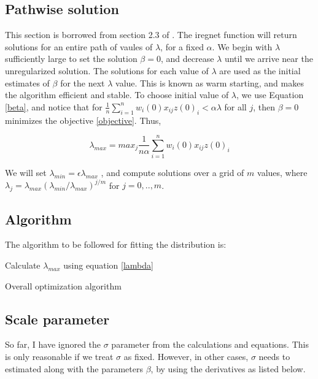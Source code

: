 \documentclass[12pt,a4paper]{report}
\begin{document}
\subsection*{Pathwise solution}
This section is borrowed from section 2.3 of \cite{a3}.
The iregnet function will return solutions for an entire path of vaules of $\lambda$, for a fixed $\alpha$.
We begin with $\lambda$ sufficiently large to set the solution $\beta = 0$, and decrease $\lambda$ until we arrive
near the unregularized solution. The solutions for each value of $\lambda$ are used as the initial
estimates of $\beta$ for the next $\lambda$ value. This is known as warm starting, and makes the algorithm efficient and stable.
To choose initial value of $\lambda$, we use Equation \ref{beta}, and notice that for $\frac{1}{n} \sum_{i=1}^n w_i(0) x_{ij} z(0)_i < \alpha \lambda$ for all $j$, then $\beta = 0$ minimizes the objective \ref{objective}. Thus,

\begin{equation} \label{lambda}
\lambda_{max} = max_j \frac{1}{n \alpha} \sum_{i=1}^n w_i(0) x_{ij} z(0)_i
\end{equation}

We will set $\lambda_{min} = \epsilon \lambda_{max}$ , and compute solutions over a grid of $m$ values, where $\lambda_j = \lambda_{max}(\lambda_{min} / \lambda_{max})^{j/m}$ for $j = 0, .., m$.

\subsection*{Algorithm}
The algorithm to be followed for fitting the distribution is:

\begin{algorithm}[H]
\SetAlgoLined
 Calculate $\lambda_{max}$ using equation \ref{lambda} \;
 \caption{Overall optimization algorithm}
\end{algorithm}

\subsection*{Scale parameter}
So far, I have ignored the $\sigma$ parameter from the calculations and equations. This is only
reasonable if we treat $\sigma$ as fixed. However, in other cases, $\sigma$ needs to estimated along with the parameters $\beta$, by using the derivatives as listed below.
\end{document}
